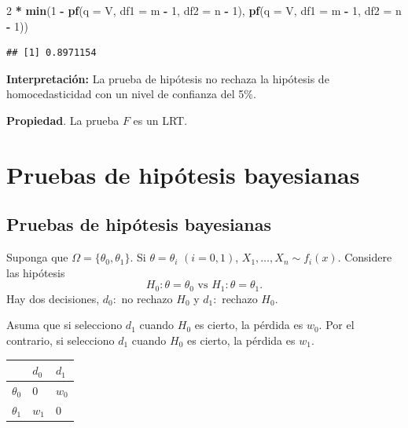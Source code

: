 \documentclass[
  12pt,
]{book}
\newenvironment{Shaded}{\begin{snugshade}}{\end{snugshade}}
\newcommand{\DataTypeTok}[1]{\textcolor[rgb]{0.13,0.29,0.53}{#1}}
\newcommand{\DecValTok}[1]{\textcolor[rgb]{0.00,0.00,0.81}{#1}}
\newcommand{\KeywordTok}[1]{\textcolor[rgb]{0.13,0.29,0.53}{\textbf{#1}}}
\newcommand{\NormalTok}[1]{#1}
\newcommand{\OperatorTok}[1]{\textcolor[rgb]{0.81,0.36,0.00}{\textbf{#1}}}
\newcommand{\StringTok}[1]{\textcolor[rgb]{0.31,0.60,0.02}{#1}}
\begin{document}
\begin{Shaded}
\begin{Highlighting}[]
\DecValTok{2} \OperatorTok{*}\StringTok{ }\KeywordTok{min}\NormalTok{(}\DecValTok{1} \OperatorTok{{-}}\StringTok{ }\KeywordTok{pf}\NormalTok{(}\DataTypeTok{q =}\NormalTok{ V, }\DataTypeTok{df1 =}\NormalTok{ m }\OperatorTok{{-}}\StringTok{ }\DecValTok{1}\NormalTok{, }\DataTypeTok{df2 =}\NormalTok{ n }\OperatorTok{{-}}\StringTok{ }\DecValTok{1}\NormalTok{),}
  \KeywordTok{pf}\NormalTok{(}\DataTypeTok{q =}\NormalTok{ V, }\DataTypeTok{df1 =}\NormalTok{ m }\OperatorTok{{-}}\StringTok{ }\DecValTok{1}\NormalTok{, }\DataTypeTok{df2 =}\NormalTok{ n }\OperatorTok{{-}}\StringTok{ }\DecValTok{1}\NormalTok{))}
\end{Highlighting}
\end{Shaded}

\begin{verbatim}
## [1] 0.8971154
\end{verbatim}

\textbf{Interpretación:} La prueba de hipótesis no rechaza la hipótesis de
homocedasticidad con un nivel de confianza del 5\%.

\textbf{Propiedad}. La prueba \(F\) es un LRT.

\hypertarget{pruebas-de-hipuxf3tesis-bayesianas}{%
\chapter{Pruebas de hipótesis bayesianas}\label{pruebas-de-hipuxf3tesis-bayesianas}}

\hypertarget{pruebas-de-hipuxf3tesis-bayesianas-1}{%
\section{Pruebas de hipótesis bayesianas}\label{pruebas-de-hipuxf3tesis-bayesianas-1}}

Suponga que \(\Omega = \{\theta_0,\theta_1\}\). Si \(\theta = \theta_i\) \((i = 0,1)\), \(X_1,\dots, X_n\sim f_i(x)\). Considere las hipótesis
\[H_0: \theta = \theta_0 \text{ vs } H_1: \theta =\theta_1.\]
Hay dos decisiones, \(d_0:\) no rechazo \(H_0\) y \(d_1:\) rechazo \(H_0\).

Asuma que si selecciono \(d_1\) cuando \(H_0\) es cierto, la pérdida es \(w_0\). Por el contrario, si selecciono \(d_1\) cuando \(H_0\) es cierto, la pérdida es \(w_1\).

\begin{longtable}[]{@{}lll@{}}
\toprule
& \(d_0\) & \(d_1\)\tabularnewline
\midrule
\endhead
\(\theta_0\) & 0 & \(w_0\)\tabularnewline
\(\theta_1\) & \(w_1\) & 0\tabularnewline
\bottomrule
\end{longtable}
\end{document}
